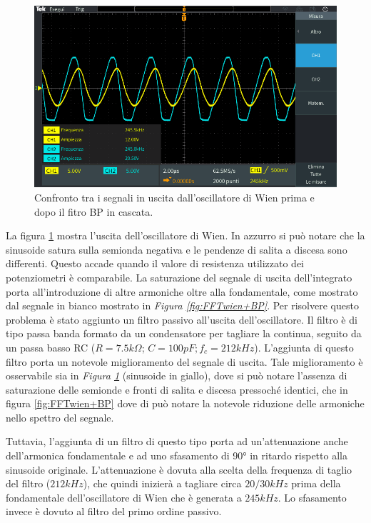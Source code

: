 \documentclass[titlepage]{report}
\begin{document}
	\begin{figure}[H]
		\centering
		\includegraphics[scale=0.5]{Immagini/osc_wien+bp210k.PNG}
		\caption{Confronto tra i segnali in uscita dall'oscillatore di Wien prima e dopo il fitro BP in cascata.}
		\label{fig:SINwien+BP}
	\end{figure}

	La figura \ref{fig:SINwien+BP} mostra l'uscita dell'oscillatore di Wien. In azzurro si può notare che la sinusoide satura sulla semionda negativa e le pendenze di salita a discesa sono differenti. Questo accade quando il valore di resistenza utilizzato dei potenziometri è comparabile. La saturazione del segnale di uscita dell'integrato porta all'introduzione di altre armoniche oltre alla fondamentale, come mostrato dal segnale in bianco mostrato in \textit{Figura \ref{fig:FFTwien+BP}}.
	Per risolvere questo problema è stato aggiunto un filtro passivo all'uscita dell'oscillatore. Il filtro è di tipo passa banda formato da un condensatore per tagliare la continua, seguito da un passa basso RC ($R = 7.5k\Omega$; $C = 100pF; f_c = 212kHz$).
	L'aggiunta di questo filtro porta un notevole miglioramento del segnale di uscita. Tale miglioramento è osservabile sia in \textit{Figura \ref{fig:SINwien+BP}} (sinusoide in giallo), dove si può notare l'assenza di saturazione delle semionde e fronti di salita e discesa pressoché identici, che in figura \ref{fig:FFTwien+BP} dove di può notare la notevole riduzione delle armoniche nello spettro del segnale.

	Tuttavia, l'aggiunta di un filtro di questo tipo porta ad un'attenuazione anche dell'armonica fondamentale e ad uno sfasamento di 90° in ritardo rispetto alla sinusoide originale. L'attenuazione è dovuta alla scelta della frequenza di taglio del filtro ($212kHz$), che quindi inizierà a tagliare circa $20/30kHz$ prima della fondamentale dell'oscillatore di Wien che è generata a $245kHz$. Lo sfasamento invece è dovuto al filtro del primo ordine passivo.
\end{document}
